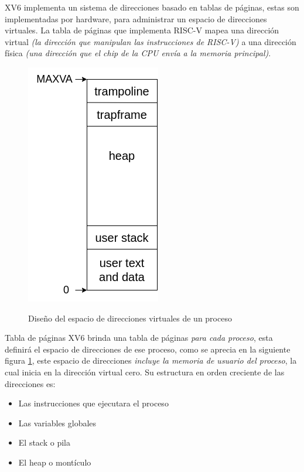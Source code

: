 \documentclass{libs/ufc_format}
\begin{document}
\begin{frame}
    XV6 implementa un sistema de direcciones basado en tablas de páginas, estas son implementadas por hardware, para administrar un espacio de direcciones virtuales. La tabla de páginas que implementa RISC-V mapea una dirección virtual \emph{(la dirección que manipulan las instrucciones de RISC-V)} a una dirección física \emph{(una dirección que el chip de la CPU envía a la memoria principal)}.\cite{xv6_book}
    \begin{figure}
        \centering
        \caption{Diseño del espacio de direcciones virtuales de un proceso}
        \includegraphics[scale=0.28]{libs/img/as.png}
        \label{fig:Espacio_Direcciones}
    \end{figure}
\end{frame}
\begin{frame}{Tabla de páginas}
    XV6 brinda una tabla de páginas \emph{para cada proceso}, esta definirá el espacio de direcciones de ese proceso, como se aprecia en la siguiente figura \ref{fig:Espacio_Direcciones}, este espacio de direcciones \emph{incluye la memoria de usuario del proceso}, la cual inicia en la dirección virtual cero. Su estructura en orden creciente de las direcciones es:

    \vspace{0.3cm}
    
    \begin{itemize}
        \item Las instrucciones que ejecutara el proceso
        \item Las variables globales
        \item El stack o pila
        \item El heap o montículo
    \end{itemize}
\end{frame}
\end{document}
